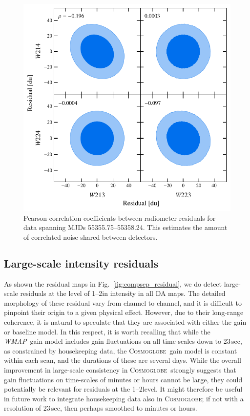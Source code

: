 \documentclass[twocolumn]{../../common/aa}
\def\WMAP{\emph{WMAP}}
\newcommand{\cosmoglobe}{\textsc{Cosmoglobe}}
\begin{document}
\begin{figure}
	\includegraphics[width=\columnwidth]{figures/res_corr.pdf}
	\caption{Pearson correlation coefficients between radiometer residuals for data spanning MJDs 55355.75--55358.24. This estimates the amount of correlated noise shared between detectors.}
	\label{fig:example_corr}
\end{figure}
\subsection{Large-scale intensity residuals}
\label{sec:quadres}

As shown the residual maps in Fig.~\ref{fig:compsep_residual}, we do detect large-scale residuals at the level of 1--2\muK in intensity in all DA maps. The detailed morphology of these residual vary from channel to channel, and it is difficult to pinpoint their origin to a given physical effect. However, due to their long-range coherence, it is natural to speculate that they are associated with either the gain or baseline model. In this respect, it is worth recalling that while the \WMAP\ gain model includes gain fluctuations on all time-scales down to 23\,sec, as constrained by housekeeping data, the \cosmoglobe\ gain model is constant within each scan, and the durations of these are several days. While the overall improvement in large-scale consistency in \cosmoglobe\ strongly suggests that gain fluctuations on time-scales of minutes or hours cannot be large, they could potentially be relevant for residuals at the 1--2\muK level. It might therefore be useful in future work to integrate housekeeping data also in \cosmoglobe; if not with a resolution of 23\,sec, then perhaps smoothed to minutes or hours.
\end{document}
